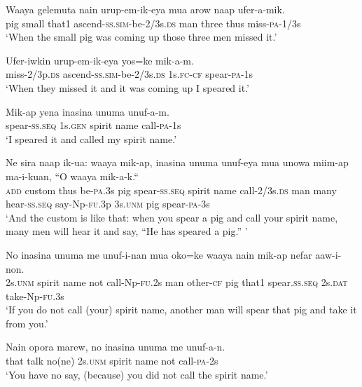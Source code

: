 \ea\label{ex:a:x14}
\gll  Waaya  gelemuta  nain  urup-em-ik-eya  mua  arow  naap  ufer-a-mik. \\
pig  small  that1  ascend-\textsc{ss}.\textsc{sim}-be-2/3s.\textsc{ds}  man  three  thus  miss-\textsc{pa}-1/3s \\
\glt ‘When the small pig was coming up those three men missed it.’ \\
\z


\ea\label{ex:a:x15}
\gll  Ufer-iwkin  urup-em-ik-eya  yos=ke  mik-a-m. \\
miss-2/3p.\textsc{ds}  ascend-\textsc{ss}.\textsc{sim}-be-2/3s.\textsc{ds}  1s.\textsc{fc}-\textsc{cf}  spear-\textsc{pa}-1s \\
\glt ‘When they missed it and it was coming up I speared it.’ \\
\z


\ea\label{ex:a:x16}
\gll  Mik-ap  yena  inasina  unuma  unuf-a-m. \\
spear-\textsc{ss.seq}  1s.\textsc{gen}  spirit  name  call-\textsc{pa}-1s \\
\glt ‘I speared it and called my spirit name.’ \\
\z


\ea\label{ex:a:x17}
\gll  Ne  sira  naap  ik-ua:  waaya  mik-ap,  inasina  unuma  unuf-eya         mua  unowa  miim-ap  ma-i-kuan,  ``O  waaya  mik-a-k.`` \\
\textsc{add}  custom  thus  be-\textsc{pa}.3s  pig  spear-\textsc{ss.seq}  spirit  name  call-2/3s.\textsc{ds}     man  many  hear-\textsc{ss.seq}  say-Np-\textsc{fu}.3p  3s.\textsc{unm}  pig  spear-\textsc{pa}-3s \\


\glt ‘And the custom is like that: when you spear a pig and call your spirit name, many men will hear it and say,  “He has speared a pig.” ’ \\
\z


\ea\label{ex:a:x18}
\gll  No  inasina  unuma  me  unuf-i-nan  mua  oko=ke  waaya  nain    mik-ap  nefar  aaw-i-non. \\
2s.\textsc{unm}  spirit  name  not  call-Np-\textsc{fu}.2s  man  other-\textsc{cf}  pig  that1   spear.\textsc{ss.seq}  2s.\textsc{dat}  take-Np-\textsc{fu}.3s \\


\glt ‘If you do not call (your) spirit name, another man will spear that pig and take it from you.’ \\
\z


\ea\label{ex:a:x19}
\gll  Nain  opora  marew,  no  inasina  unuma  me  unuf-a-n. \\
that  talk  no(ne)  2s.\textsc{unm}  spirit  name  not  call-\textsc{pa}-2s \\
\glt ‘You have no say, (because) you did not call the spirit name.’ \\
\z


